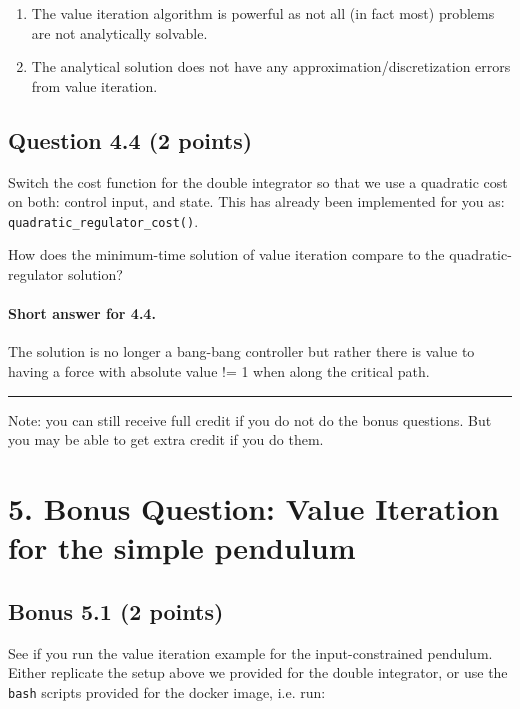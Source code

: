 \documentclass[11pt]{article}
\begin{document}
\begin{enumerate}
\def\labelenumi{\alph{enumi})}
\item
  The value iteration algorithm is powerful as not all (in fact most)
  problems are not analytically solvable.
\item
  The analytical solution does not have any approximation/discretization
  errors from value iteration.
\end{enumerate}

    \subsection{Question 4.4 (2 points)}\label{question-4.4-2-points}

Switch the cost function for the double integrator so that we use a
quadratic cost on both: control input, and state. This has already been
implemented for you as: \texttt{quadratic\_regulator\_cost()}.

How does the minimum-time solution of value iteration compare to the
quadratic-regulator solution?

    \paragraph{Short answer for 4.4.}\label{short-answer-for-4.4.}

The solution is no longer a bang-bang controller but rather there is
value to having a force with absolute value != 1 when along the critical
path.

    \begin{center}\rule{0.5\linewidth}{\linethickness}\end{center}

Note: you can still receive full credit if you do not do the bonus
questions. But you may be able to get extra credit if you do them.

\section{5. Bonus Question: Value Iteration for the simple
pendulum}\label{bonus-question-value-iteration-for-the-simple-pendulum}

\subsection{Bonus 5.1 (2 points)}\label{bonus-5.1-2-points}

See if you run the value iteration example for the input-constrained
pendulum. Either replicate the setup above we provided for the double
integrator, or use the \texttt{bash} scripts provided for the docker
image, i.e. run:
\end{document}

